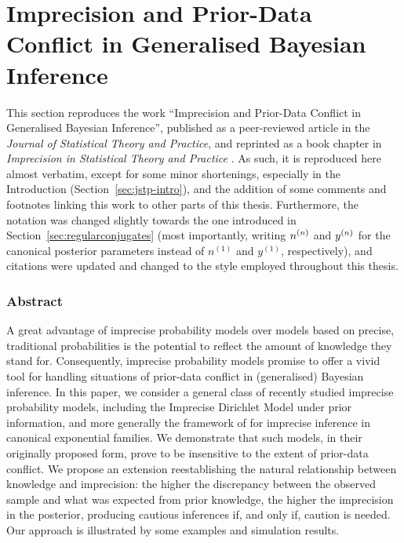 \section{Imprecision and Prior-Data Conflict in Generalised Bayesian Inference}
\label{sec:jstp}

This section reproduces the work
``Imprecision and Prior-Data Conflict in Generalised Bayesian Inference'',
published as a peer-reviewed article in the \emph{Journal of Statistical Theory and Practice},
and reprinted as a book chapter in \emph{Imprecision in Statistical Theory and Practice}
\parencite{Walter2009a}.
As such, it is reproduced here almost verbatim,
except for some minor shortenings, especially in the Introduction (Section~\ref{sec:jstp-intro}),
and the addition of some comments and footnotes linking this work to other parts of this thesis.
Furthermore, the notation was changed slightly towards the one introduced in Section~\ref{sec:regularconjugates}
(most importantly, writing $n^{(n)}$ and $y^{(n)}$ for the canonical posterior parameters
instead of $n^{(1)}$ and $y^{(1)}$, respectively),
and citations were updated and changed to the style employed throughout this thesis.

\subsubsection*{Abstract}

A great advantage of imprecise probability models over models
based on precise, traditional probabilities is the potential to
reflect the amount of knowledge they stand for. Consequently,
imprecise probability models promise to offer a vivid tool for
handling situations of prior-data conflict in (generalised) Bayesian
inference. In this paper, we consider a general class of recently
studied imprecise probability models, including the Imprecise
Dirichlet Model \parencite[IDM,][]{1996:walley::idm} under prior information, and more generally the
framework of \textcite{2005:quaeghebeurcooman} for imprecise inference in
canonical exponential families. We demonstrate that such models, in
their originally proposed form, prove to be insensitive to the
extent of prior-data conflict. We propose an extension
reestablishing the natural relationship between knowledge and
imprecision: the higher the discrepancy between the observed sample
and what was expected from prior knowledge, the higher the
imprecision in the posterior, producing cautious inferences if, and
only if, caution is needed. Our approach is illustrated by some
examples and simulation results.


